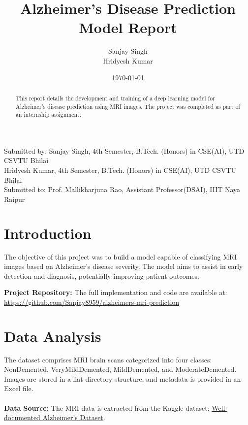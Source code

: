 \documentclass{article}
\title{Alzheimer's Disease Prediction Model Report}
\author{Sanjay Singh \\ Hridyesh Kumar}
\date{\today}
\begin{document}
\maketitle

\begin{center}
Submitted by: Sanjay Singh, 4th Semester, B.Tech. (Honors) in CSE(AI), UTD CSVTU Bhilai \\
Hridyesh Kumar, 4th Semester, B.Tech. (Honors) in CSE(AI), UTD CSVTU Bhilai \\
Submitted to: Prof. Mallikharjuna Rao, Assistant Professor(DSAI), IIIT Naya Raipur
\end{center}

\begin{abstract}
This report details the development and training of a deep learning model for Alzheimer's disease prediction using MRI images. The project was completed as part of an internship assignment.
\end{abstract}

\section{Introduction}
The objective of this project was to build a model capable of classifying MRI images based on Alzheimer's disease severity. The model aims to assist in early detection and diagnosis, potentially improving patient outcomes.

\textbf{Project Repository:} The full implementation and code are available at: 
\href{https://github.com/Sanjay8959/alzheimers-mri-prediction}{https://github.com/Sanjay8959/alzheimers-mri-prediction}

\section{Data Analysis}
The dataset comprises MRI brain scans categorized into four classes: NonDemented, VeryMildDemented, MildDemented, and ModerateDemented. Images are stored in a flat directory structure, and metadata is provided in an Excel file.\\
\\
\textbf{Data Source:} The MRI data is extracted from the Kaggle dataset: \href{https://www.kaggle.com/datasets/yiweilu2033/well-documented-alzheimers-dataset}{Well-documented Alzheimer's Dataset}.
\end{document}
